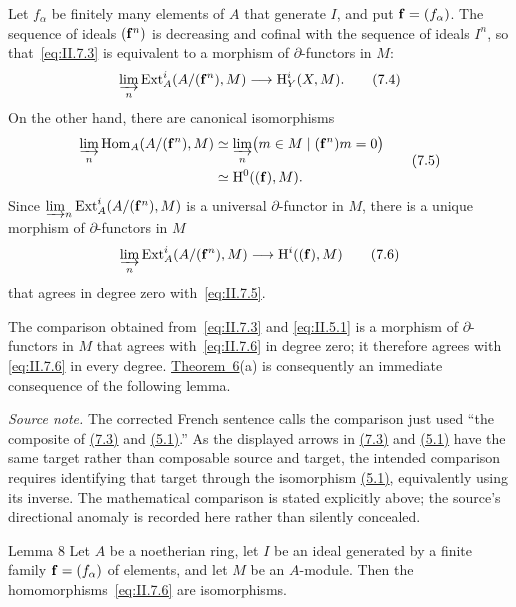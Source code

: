 Let $f_\alpha$ be finitely many elements of $A$ that generate $I$, and put
$\mathbf f=(f_\alpha)$. The sequence of ideals $(\mathbf f^n)$ is decreasing and
cofinal with the sequence of ideals $I^n$, so that~\eqref{eq:II.7.3} is
equivalent to a morphism of $\partial$-functors in $M$:
\begin{equation}
  \varinjlim_n\operatorname{Ext}_A^i(A/(\mathbf f^n),M)
  \longrightarrow \mathrm H_Y^i(X,M).
  \tag{7.4}\label{eq:II.7.4}
\end{equation}
On the other hand, there are canonical isomorphisms
\begin{equation}
\begin{split}
  \varinjlim_n\operatorname{Hom}_A(A/(\mathbf f^n),M)
  &\simeq \varinjlim_n
    \bigl(m\in M\mid(\mathbf f^n)m=0\bigr) \\
  &\simeq \mathrm H^0((\mathbf f),M).
\end{split}
  \tag{7.5}\label{eq:II.7.5}
\end{equation}
Since $\varinjlim_n\operatorname{Ext}_A^i(A/(\mathbf f^n),M)$ is a universal
$\partial$-functor in $M$, there is a unique morphism of $\partial$-functors
in $M$
\begin{equation}
  \varinjlim_n\operatorname{Ext}_A^i(A/(\mathbf f^n),M)
  \longrightarrow \mathrm H^i((\mathbf f),M)
  \tag{7.6}\label{eq:II.7.6}
\end{equation}
that agrees in degree zero with~\eqref{eq:II.7.5}.

The comparison obtained from~\eqref{eq:II.7.3} and
\eqref{eq:II.5.1} is a morphism of $\partial$-functors in $M$ that agrees
with~\eqref{eq:II.7.6} in degree zero; it therefore agrees with
\eqref{eq:II.7.6} in every degree. \hyperref[II.6]{Theorem~6}(a) is consequently an immediate
consequence of the following lemma.

\noindent\textit{Source note.} The corrected French sentence calls the
comparison just used ``the composite of \hyperref[eq:II.7.3]{(7.3)} and \hyperref[eq:II.5.1]{(5.1)}.'' As the displayed
arrows in \hyperref[eq:II.7.3]{(7.3)} and \hyperref[eq:II.5.1]{(5.1)} have the same target rather than composable source
and target, the intended comparison requires identifying that target through
the isomorphism \hyperref[eq:II.5.1]{(5.1)}, equivalently using its inverse. The mathematical
comparison is stated explicitly above; the source's directional anomaly is
recorded here rather than silently concealed.

\begin{sgastatement}{Lemma 8}
Let $A$ be a noetherian ring, let $I$ be an ideal generated by a finite
family $\mathbf f=(f_\alpha)$ of elements, and let $M$ be an $A$-module. Then the
homomorphisms~\eqref{eq:II.7.6} are isomorphisms.
\end{sgastatement}

